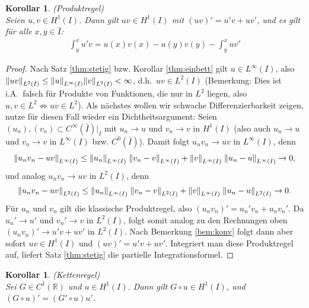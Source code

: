 \documentclass[twoside]{article}
\newtheorem{corollary}[theorem]{Korollar}
\theoremstyle{definition}
\begin{document}
\begin{corollary}(Produktregel) \label{kor:partint}\\
Seien $u,v \in H^1(I)$. Dann gilt $uv \in H^1(I)$ mit $(uv)'=u'v+uv'$, und es gilt für alle $x,y \in \bar{I}$:
\begin{align}
\int_y^x u'v = u(x)v(x)-u(y)v(y)-\int_y^xuv'
\end{align}
\end{corollary}
\begin{proof}
Nach Satz \ref{thm:stetig} bzw. Korollar \ref{thm:einbett} gilt $u \in L^\infty(I)$, also $\norm{uv}_{L^2(I)} \leq \norm{u}_{L^\infty(I)} \norm{v}_{L^2(I)} < \infty$, d.h.\ $uv \in L^2(I)$ (Bemerkung: Dies ist i.A.\ falsch für Produkte von Funktionen, die nur in $L^2$ liegen, also $u,v \in L^2 \not \Rightarrow uv \in L^2$). Als nächstes wollen wir schwache Differenzierbarkeit zeigen, nutze für diesen Fall wieder ein Dichtheitsargument: Seien $(u_n),(v_n) \subset C^\infty(\bar{I})\vert_{I}$ mit $u_n \to u$ und $v_n \to v$ in $H^1(I)$ (also auch $u_n \to u$ und $v_n \to v$ in $L^\infty(I)$ bzw. $C^0(\bar{I})$). Damit folgt $u_n  v_n \to uv$ in $L^\infty(I)$, denn 
\begin{align*}
\norm{u_n  v_n - uv}_{L^\infty(I)} \leq \norm{u_n}_{L^\infty(I)} \;  \norm{v_n - v}_{L^\infty(I)} + \norm{v}_{L^\infty(I)} \; \norm{u_n - u}_{L^\infty(I)} \to 0,
\end{align*}
und analog $u_n  v_n \to uv$ in $L^2(I)$, denn
\begin{align*}
\norm{u_n  v_n - uv}_{L^2(I)} \leq \norm{u_n}_{L^\infty(I)}  \; \norm{v_n - v}_{L^2(I)} + \norm{v}_{L^\infty(I)} \; \norm{u_n - u}_{L^2(I)} \to 0.
\end{align*}
Für $u_n$ und $v_n$ gilt die klassische Produktregel, also $(u_n v_n)' = u_n' v_n + u_n v_n'$. Da $u_n' \to u'$ und $v_n'\to v$ in $L^2(I)$, folgt somit analog zu den Rechnungen oben $(u_n v_n)' \to u' v + u v'$ in $L^2(I)$. Nach Bemerkung \ref{bem:konv} folgt dann aber sofort $uv \in H^1(I)$ und $(uv)' = u' v + u v'$. Integriert man diese Produktregel auf, liefert Satz \ref{thm:stetig} die partielle Integrationsformel.
\end{proof}
\begin{corollary}(Kettenregel) \label{kor:kett}\\
Sei $G \in C^1(\mathbb{R})$ und $u \in H^1(I)$. Dann gilt $G \circ u \in H^1(I)$, und $(G \circ u)'=(G' \circ u)u'$.
\end{corollary}
\end{document}
